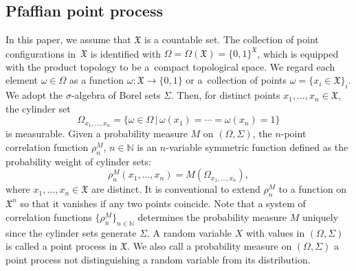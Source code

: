 \documentclass[pdftex]{sigma}
\numberwithin{equation}{section}
\newcommand{\mfrak}[1]{\mathfrak{#1}}
\newcommand{\mbb}[1]{\mathbb{#1}}
\begin{document}
\subsection{Pfaffian point process}
In this paper, we assume that $\mfrak{X}$ is a countable set. The collection of point configurations in~$\mfrak{X}$ is identified with $\Omega=\Omega (\mfrak{X})=\{0,1\}^{\mfrak{X}}$, which is equipped with the product topology to be a~compact topological space. We regard each element $\omega\in \Omega$ as a function $\omega\colon \mfrak{X}\to\{0,1\}$ or a~collection of points $\omega=\{x_{i}\in\mfrak{X}\}_{i}$. We adopt the $\sigma$-algebra of Borel sets $\Sigma$. Then, for distinct points $x_{1},\dots, x_{n}\in \mfrak{X}$, the cylinder set
\begin{equation*}
	\Omega_{x_{1},\dots, x_{n}}=\{\omega\in\Omega\,|\,\omega (x_{1})=\cdots =\omega (x_{n})=1\}
\end{equation*}
is measurable.
Given a probability measure $M$ on $(\Omega,\Sigma)$, the $n$-point correlation function $\rho^{M}_{n}$, $n\in\mbb{N}$ is an $n$-variable symmetric function defined as the probability weight of cylinder sets:
\begin{equation*}
	\rho^{M}_{n}(x_{1},\dots, x_{n})=M(\Omega_{x_{1},\dots, x_{n}}),
\end{equation*}
where $x_{1},\dots, x_{n}\in \mfrak{X}$ are distinct. It is conventional to extend $\rho^{M}_{n}$ to a function on $\mfrak{X}^{n}$ so that it vanishes if any two points coincide.
Note that a system of correlation functions $\big\{\rho^{M}_{n}\big\}_{n\in\mbb{N}}$ determines the probability measure $M$ uniquely since the cylinder sets generate $\Sigma$.
A random variable $X$ with values in $(\Omega,\Sigma)$ is called a point process in $\mfrak{X}$. We also call a probability measure on $(\Omega,\Sigma)$ a point process not distinguishing a random variable from its distribution.
\end{document}
